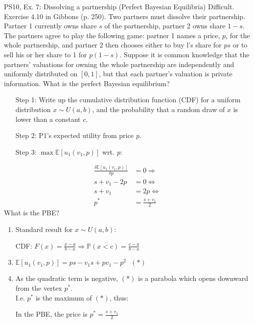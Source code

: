 \begin{frame}{PS10, Ex. 7: Dissolving a partnership (Perfect Bayesian Equilibria)}
    Difficult. Exercise 4.10 in Gibbons (p. 250). Two partners must dissolve their partnership. Partner 1 currently owns share $s$ of the partnership, partner 2 owns share $1-s$. The partners agree to play the following game: partner 1 names a price, $p$, for the whole partnership, and partner 2 then chooses either to buy l's share for $ps$ or to sell his or her share to 1 for $p(1-s)$. Suppose it is common knowledge that the partners' valuations for owning the whole partnership are independently and uniformly distributed on $[0,1]$, but that each partner's valuation is private information. What is the perfect Bayesian equilibrium?\vspace{-11pt}
    \begin{multicols}{2}
      \begin{itemize}
        \item[Step 1:] Write up the cumulative distribution function (CDF) for a uniform distribution $x\sim U(a, b)$, and the probability that a random draw of $x$ is lower than a constant $c$.
        \item[Step 2:] P1's expected utility from price \textit{p}.
        \item[Step 3:] $\max\mathbb{E}[u_1(v_1,p)]$ wrt. \textit{p}:
      \end{itemize}\vspace{-6pt}
      \begin{align*}
        \frac{\delta \mathbb{E}[u_1(v_1,p)]}{\delta p}&=0\Rightarrow\\
        s+v_1-2p&=0\Leftrightarrow\\
        s+v_1&=2p\Leftrightarrow\\
        p^*&=\frac{s+v_1}{2}
      \end{align*}
      What is the PBE?
      \vfill\null\columnbreak
      \begin{enumerate}
        \item Standard result for $x\sim U(a, b):$
        \item[CDF:] $F(x)=\frac{x-a}{b-a}\Rightarrow\mathbb{P}(x<c)=\frac{c-a}{b-a}$
        \item $\mathbb{E}[u_1(v_1,p)]=ps-v_1s+pv_1-p^2\ \ \ (*)$
        \item As the quadratic term is negative, $(*)$ is a parabola which opens downward from the vertex $p^*$.\\
        I.e. $p^*$ is the maximum of $(*)$, thus:
        \item[] In the PBE, the price is $p^*=\frac{s+v_1}{2}$
      \end{enumerate}
      \vfill\null
    \end{multicols}
\end{frame}
